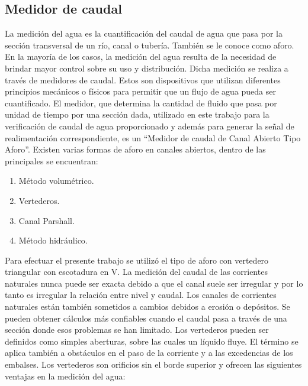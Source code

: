 \subsection{Medidor de caudal}
\label{subsec:Medidor de caudal}
La medición del agua es la cuantificación del caudal de agua que pasa por la sección transversal de un río, canal o tubería. También se le conoce como aforo. 
En la mayoría de los casos, la medición del agua resulta de la necesidad de brindar mayor control sobre su uso y distribución. Dicha medición se realiza a través de medidores de caudal. Estos son dispositivos que utilizan diferentes principios mecánicos o físicos para permitir que un flujo de agua pueda ser cuantificado. 
El medidor, que determina la cantidad de fluido que pasa por unidad de tiempo por una sección dada, utilizado en este trabajo para la verificación de caudal de agua proporcionado y además para generar la señal de realimentación correspondiente, es un “Medidor de caudal de Canal Abierto Tipo Aforo”.
Existen varias formas de aforo en canales abiertos, dentro de las principales se encuentran:
\begin{enumerate}
	\item Método volumétrico.
	\item Vertederos.
	\item Canal Parshall. 
	\item Método hidráulico.
\end{enumerate}
Para efectuar el presente trabajo se utilizó el tipo de aforo con vertedero triangular con escotadura en V.
La medición del caudal de las corrientes naturales nunca puede ser exacta debido a que el canal suele ser irregular y por lo tanto es irregular la relación entre nivel y caudal. Los canales de corrientes naturales están también sometidos a cambios debidos a erosión o depósitos. Se pueden obtener cálculos más confiables cuando el caudal pasa a través de una sección donde esos problemas se han limitado. Los vertederos pueden ser definidos como simples aberturas, sobre las cuales un líquido fluye. El término se aplica también a obstáculos en el paso de la corriente y a las excedencias de los embalses. Los vertederos son orificios sin el borde superior y ofrecen las siguientes ventajas en la medición del agua: 

